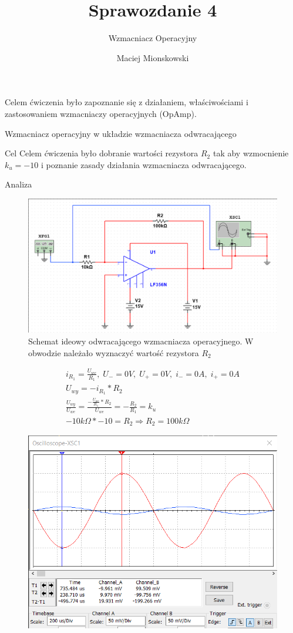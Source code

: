 \documentclass[a4paper]{scrartcl}
\author{Maciej Mionskowski}
\title{Sprawozdanie 4}
\date{}
\subtitle{Wzmacniacz Operacyjny}
\begin{document}
	{\let\newpage\relax\maketitle}
	{\begin{center}Celem ćwiczenia było zapoznanie się z działaniem, właściwościami i zastosowaniem wzmacniaczy operacyjnych (OpAmp).\end{center}}
	\begin{section}{Wzmacniacz operacyjny w układzie wzmacniacza odwracającego}
		\begin{subsection}{Cel}
			Celem ćwiczenia było dobranie wartości rezystora $R_{2}$ tak aby wzmocnienie $k_{u} = -10 $ i poznanie zasady działania wzmacniacza odwracającego.
		\end{subsection}
		\begin{subsection}{Analiza}
				\begin{figure}[ht]
				\begin{center}
					\includegraphics[width=0.8\linewidth]{03-circuit}
					\caption{Schemat ideowy odwracającego wzmacniacza operacyjnego. W obwodzie należało wyznaczyć wartość rezystora $ R_{2} $ }
					\label{fig:circuit-1}
				\end{center}
				\end{figure}
				\begin{gather*}
					i_{R_{1}} = \frac{U_{we}}{R_{1}},\; U_{-} = 0V,\; U_{+} = 0V,\; i_{-} = 0A,\; i_{+} = 0A  \\[5pt]
					U_{wy} = -i_{R_{1}}*R_{2}  \\[5pt]
					\frac{U_{wy}}{U_{we}} = \frac{-\frac{U_{we}}{R_{1}}*R_{2}}{U_{we}} = -\frac{R_{2}}{R_{1}} = k_{u} \\[5pt]
					-10k\Omega * -10 = R_{2} \Rightarrow R_{2} = 100k\Omega
				\end{gather*}
				\begin{figure}[ht]
				\begin{center}
					\includegraphics[width=0.5\linewidth]{03-osc}

\end{center}
\end{figure}
\end{subsection}
\end{section}
\end{document}
